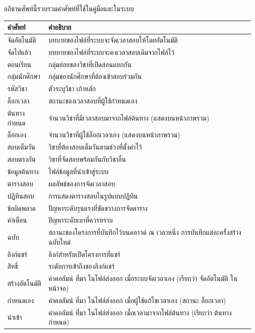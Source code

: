 
\noindent อภิธานศัพท์นี้รวบรวมคำศัพท์ที่ใช้ในคู่มือและในระบบ

\begin{small}
\renewcommand{\arraystretch}{1.25}
\begin{longtable}{L{4.5cm}L{10cm}}
\toprule
\textbf{คำศัพท์} & \textbf{คำอธิบาย} \\
\midrule
จัดอัตโนมัติ & บทบาทของไฟล์ที่ระบบจะจัดเวลาสอบให้โดยอัตโนมัติ \\
จัดไปแล้ว & บทบาทของไฟล์ที่ระบบจะคงเวลาสอบเดิมจากไฟล์ไว้ \\
ตอนเรียน & กลุ่มย่อยของวิชาที่เปิดสอนแยกกัน \\
กลุ่มนักศึกษา & กลุ่มของนักศึกษาที่ต้องเข้าสอบร่วมกัน \\
รหัสวิชา & ตัวระบุวิชา เก้าหลัก \\
ล็อกเวลา & สถานะของเวลาสอบที่ผู้ใช้กำหนดเอง \\
ต้นทางกำหนด & จำนวนวิชาที่มีเวลาสอบมาจากไฟล์ต้นทาง (แสดงบนหน้าภาพรวม) \\
ล็อกเอง & จำนวนวิชาที่ผู้ใช้ล็อกเวลาเอง (แสดงบนหน้าภาพรวม) \\
สอบเต็มวัน & วิชาที่ต้องสอบเต็มวันตามช่วงที่ตั้งค่าไว้ \\
สอบตรงกัน & วิชาที่จัดสอบพร้อมกันกับวิชาอื่น \\
ข้อมูลต้นทาง & ไฟล์ข้อมูลที่นำเข้าสู่ระบบ \\
ตารางสอบ & ผลลัพธ์ของการจัดเวลาสอบ \\
ปฏิทินสอบ & การแสดงตารางสอบในรูปแบบปฏิทิน \\
ข้อผิดพลาด & ปัญหาระดับรุนแรงที่ขัดขวางการจัดตาราง \\
คำเตือน & ปัญหาระดับเบาที่ควรทราบ \\
ฉบับ & สถานะของโครงการที่บันทึกไว้บนคลาวด์ ณ เวลาหนึ่ง การบันทึกแต่ละครั้งสร้างฉบับใหม่ \\
ลิงก์แชร์ & ลิงก์สำหรับเปิดโครงการที่แชร์ \\
สิทธิ์ & ระดับการเข้าถึงของลิงก์แชร์ \\
สร้างอัตโนมัติ & ค่าคอลัมน์ ที่มา ในไฟล์ส่งออก เมื่อระบบจัดเวลาเอง (เรียกว่า จัดอัตโนมัติ ในหน้าจอ) \\
กำหนดเอง & ค่าคอลัมน์ ที่มา ในไฟล์ส่งออก เมื่อผู้ใช้แก้ไขเวลาเอง (สถานะ ล็อกเวลา) \\
นำเข้า & ค่าคอลัมน์ ที่มา ในไฟล์ส่งออก เมื่อเวลามาจากไฟล์ต้นทาง (เรียกว่า ต้นทางกำหนด) \\
\bottomrule
\end{longtable}
\end{small}
